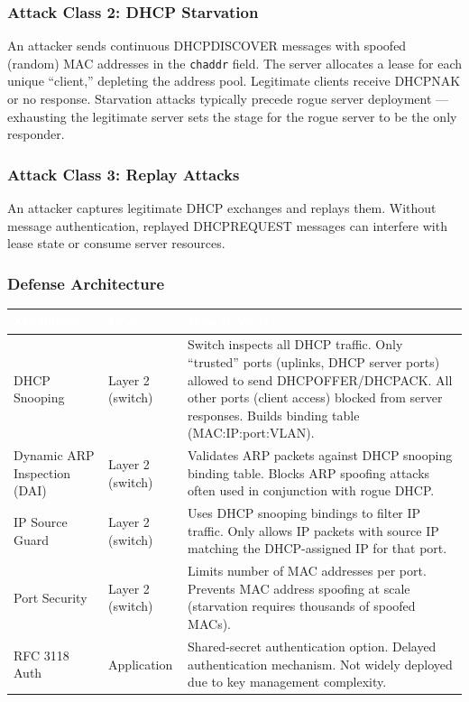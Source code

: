 \documentclass[11pt,letterpaper]{article}
\newcommand{\tableheader}[1]{\textbf{\sffamily\textcolor{white}{#1}}}
\begin{document}
\subsubsection{Attack Class 2: DHCP Starvation}

An attacker sends continuous DHCPDISCOVER messages with spoofed (random) MAC addresses in the \texttt{chaddr} field. The server allocates a lease for each unique ``client,'' depleting the address pool. Legitimate clients receive DHCPNAK or no response. Starvation attacks typically precede rogue server deployment --- exhausting the legitimate server sets the stage for the rogue server to be the only responder.

\subsubsection{Attack Class 3: Replay Attacks}

An attacker captures legitimate DHCP exchanges and replays them. Without message authentication, replayed DHCPREQUEST messages can interfere with lease state or consume server resources.

\subsubsection{Defense Architecture}

\begin{center}
\begin{tabularx}{\textwidth}{L{3cm}L{2.5cm}X}
\toprule
{}
\tableheader{Mechanism} & \tableheader{Layer} & \tableheader{How It Works} \\
\midrule
DHCP Snooping & Layer 2 (switch) & Switch inspects all DHCP traffic. Only ``trusted'' ports (uplinks, DHCP server ports) allowed to send DHCPOFFER/DHCPACK. All other ports (client access) blocked from server responses. Builds binding table (MAC:IP:port:VLAN). \\
Dynamic ARP Inspection (DAI) & Layer 2 (switch) & Validates ARP packets against DHCP snooping binding table. Blocks ARP spoofing attacks often used in conjunction with rogue DHCP. \\
IP Source Guard & Layer 2 (switch) & Uses DHCP snooping bindings to filter IP traffic. Only allows IP packets with source IP matching the DHCP-assigned IP for that port. \\
Port Security & Layer 2 (switch) & Limits number of MAC addresses per port. Prevents MAC address spoofing at scale (starvation requires thousands of spoofed MACs). \\
RFC 3118 Auth & Application & Shared-secret authentication option. Delayed authentication mechanism. Not widely deployed due to key management complexity. \\
\bottomrule
\end{tabularx}
\end{center}
\end{document}
